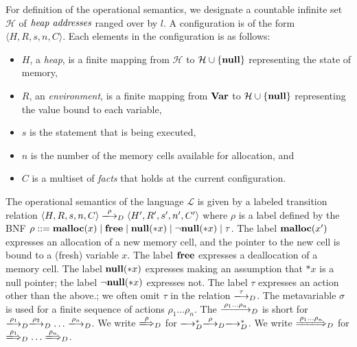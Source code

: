 For definition of the operational semantics, we designate a countable
infinite set \(\mathcal{H}\) of \(\emph{heap addresses}\) ranged over by
\(l\).  A configuration is of the form \(\langle H, R, s, n, C
\rangle\).  Each elements in the configuration is as follows:
\begin{itemize}
\item \(H\), a \emph{heap}, is a finite mapping from \(\mathcal{H}\) to
  \(\mathcal{H} \cup \{\mathbf{null}\}\) representing the state of memory,
\item \(R\), an \emph{environment}, is a finite mapping from \(\mathbf{Var}\)
  to \(\mathcal{H} \cup \{\mathbf{null}\}\) representing the value bound to
      each variable,
\item \(s\) is the statement that is being executed,
\item \(n\) is the number of the memory cells available for allocation,
      and
\item \(C\) is a multiset of \emph{facts} that holds at the current
      configuration.
\end{itemize}

The operational semantics of the language \(\mathcal{L}\) is given by a
labeled transition relation \(\langle H, R, s, n, C \rangle
\xlongrightarrow{\rho}_D \langle H', R', s', n', C' \rangle\) where
\(\rho\) is a label defined by the BNF $\rho ::= \mathbf{malloc}(x) \mid \mathbf{free}
\mid \mathbf{null}(*x) \mid \neg\mathbf{null}(*x) \mid \tau$.  The label \(\mathbf{malloc}(x')\)
expresses an allocation of a new memory cell, and the pointer to the new
cell is bound to a (fresh) variable \(x\).  The label \(\mathbf{free}\)
expresses a deallocation of a memory cell.  The label \(\mathbf{null}(*x)\)
expresses making an assumption that \(*x\) is a null pointer; the label
$\neg\mathbf{null}(*x)$ expresses not.  The label \(\tau\) expresses an action other
than the above.; we often omit \(\tau\) in the relation
\(\xlongrightarrow{\tau}_D\).  The metavariable \(\sigma\) is used for a
finite sequence of actions \(\rho_1\dots\rho_n\). The
\(\xlongrightarrow{\rho_1\dots\rho_n}_D\) is short for
\(\xlongrightarrow{\rho_1}_D\xlongrightarrow{\rho_2}_D\dots\xlongrightarrow{\rho_n}_D\).
We write \(\xLongrightarrow{\rho}_D\) for
\(\xlongrightarrow{}_D^*\xlongrightarrow{\rho}_D\xlongrightarrow{}_D^*\).
We write \(\xLongrightarrow{\rho_1\dots\rho_n}_D\) for
\(\xLongrightarrow{\rho_1}_D\dots\xLongrightarrow{\rho_n}_D\).

